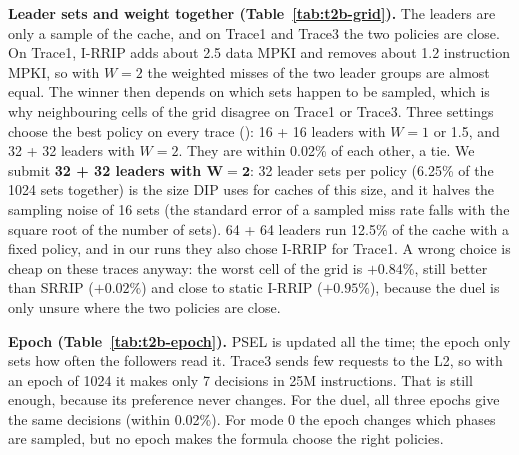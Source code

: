 \textbf{Leader sets and weight together (Table~\ref{tab:t2b-grid}).} The leaders are only a sample of the cache, and
on Trace1 and Trace3 the two policies are close. On Trace1, I-RRIP adds about 2.5 data MPKI and removes about 1.2
instruction MPKI, so with $W = 2$ the weighted misses of the two leader groups are almost equal. The winner then depends
on which sets happen to be sampled, which is why neighbouring cells of the grid disagree on Trace1 or Trace3. Three
settings choose the best policy on every trace (\cmark): 16 + 16 leaders with $W = 1$ or 1.5, and 32 + 32 leaders with
$W = 2$. They are within 0.02\% of each other, a tie. We submit \textbf{32 + 32 leaders with $\boldsymbol{W = 2}$}:
32 leader sets per policy (6.25\% of the 1024 sets together) is the size DIP uses for caches of this size, and it
halves the sampling noise of 16 sets (the standard error of a sampled miss rate falls with the square root of the
number of sets). 64 + 64 leaders run 12.5\% of the cache with a fixed policy, and in our runs they also chose I-RRIP
for Trace1. A wrong choice is cheap on these traces anyway: the worst cell of the grid is $+0.84\%$, still better
than SRRIP ($+0.02\%$) and close to static I-RRIP ($+0.95\%$), because the duel is only unsure where the two policies
are close.

\textbf{Epoch (Table~\ref{tab:t2b-epoch}).} PSEL is updated all the time; the epoch only sets how often the followers
read it. Trace3 sends few requests to the L2, so with an epoch of 1024 it makes only 7 decisions in 25M instructions.
That is still enough, because its preference never changes. For the duel, all three epochs give the same decisions
(within 0.02\%). For mode 0 the epoch changes which phases are sampled, but no epoch makes the formula choose the
right policies.

